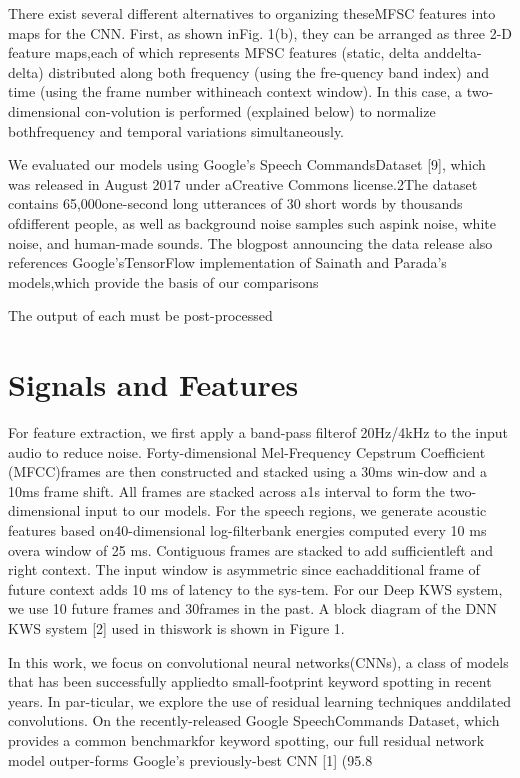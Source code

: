 There exist several different alternatives to organizing theseMFSC features into maps for the CNN. First, as shown inFig. 1(b), they can be arranged as three 2-D feature maps,each of which represents MFSC features (static, delta anddelta-delta) distributed along both frequency (using the fre-quency band index) and time (using the frame number withineach context window). In this case, a two-dimensional con-volution is performed (explained below) to normalize bothfrequency and temporal variations simultaneously. 


We evaluated our models using Google’s Speech CommandsDataset  [9],  which  was  released  in  August  2017  under  aCreative  Commons  license.2The  dataset  contains  65,000one-second long utterances of 30 short words by thousands ofdifferent people, as well as background noise samples such aspink noise, white noise, and human-made sounds.  The blogpost  announcing  the  data  release  also  references  Google’sTensorFlow implementation of Sainath and Parada’s models,which provide the basis of our comparisons


The output of each must be post-processed

\section{Signals and Features}
For  feature  extraction,   we  first  apply  a  band-pass  filterof  20Hz/4kHz  to  the  input  audio  to  reduce  noise.    Forty-dimensional  Mel-Frequency  Cepstrum  Coefficient  (MFCC)frames are then constructed and stacked using a 30ms win-dow and a 10ms frame shift.  All frames are stacked across a1s interval to form the two-dimensional input to our models.
For the speech regions, we generate acoustic features based on40-dimensional log-filterbank energies computed every 10 ms overa window of 25 ms. Contiguous frames are stacked to add sufficientleft and right context. The input window is asymmetric since eachadditional frame of future context adds 10 ms of latency to the sys-tem. For our Deep KWS system, we use 10 future frames and 30frames in the past.
A  block  diagram  of  the  DNN  KWS  system  [2]  used  in  thiswork is shown in Figure 1. 




In this work, we focus on convolutional neural networks(CNNs), a class of models that has been successfully appliedto small-footprint keyword spotting in recent years.  In par-ticular, we explore the use of residual learning techniques anddilated convolutions. On the recently-released Google SpeechCommands  Dataset,  which  provides  a  common  benchmarkfor keyword spotting, our full residual network model outper-forms Google’s previously-best CNN [1] (95.8%


